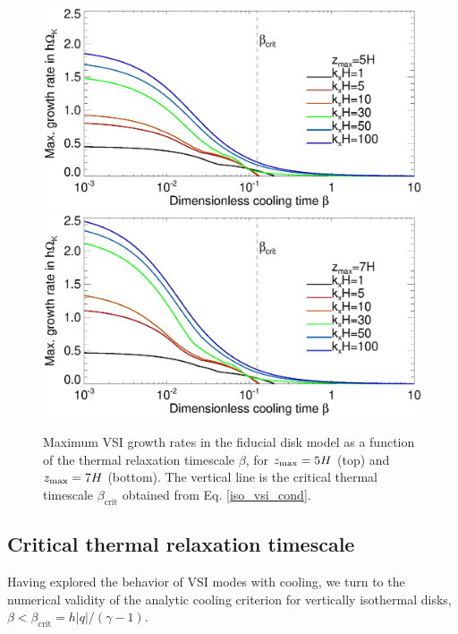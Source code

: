\begin{figure}
  \includegraphics[scale=0.4415,clip=true,trim=0cm 1.75cm 0cm
  0.9cm]{figures/gcorr_compare_iso_maxrate_z5} 
  \includegraphics[scale=0.4415,clip=true,trim=0cm 0.0cm 0cm
  0.9cm]{figures/gcorr_compare_iso_maxrate_z7}  
  \caption{Maximum VSI growth rates in the fiducial disk 
     model as a function of the thermal relaxation timescale
     $\beta$, for %
     $z_\mathrm{max}=5H$ (top) and $z_\mathrm{max}=7H$ (bottom). The vertical line is the
     critical thermal timescale $\beta_\mathrm{crit}$ obtained  
     from Eq. \ref{iso_vsi_cond}. 
     \label{bcrit_compare1}}   
 \end{figure} 


\subsection{Critical thermal relaxation timescale}\label{bcrit_num_test}
Having explored the behavior of VSI modes with cooling, we turn to the numerical validity of the 
analytic cooling criterion for vertically isothermal disks, $\beta < \beta_\mathrm{crit} = h|q|/(\gamma -1)$.

